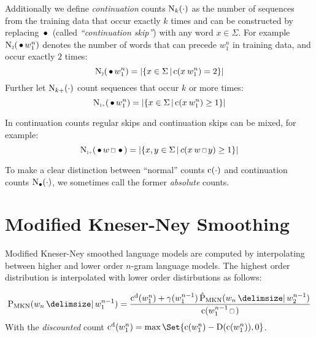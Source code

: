 
Additionally we define \emph{continuation} counts $\operatorname{N}_k(\cdot)$ as
the number of sequences from the training data that occur exactly $k$ times and
can be constructed by replacing $\,\bullet\,$ (called \emph{``continuation skip''})
with any word $x \in \Sigma$.
For example $\ContCountII(\WSkp w_1^n)$ denotes the number of words that can
precede $w_1^n$ in training data, and occur exactly $2$ times:
\begin{equation}
  \ContCountII(\WSkp w_1^n) =
    \Cardinality{\left\{ x \in \Sigma \,\middle|\, \Count(x \: w_1^n) = 2 \right\}}
\end{equation}
Further let $\operatorname{N}_{k+}(\cdot)$ count sequences that occur $k$ or more
times:
\begin{equation}
  \ContCountIp(\WSkp w_1^n) =
    \Cardinality{\left\{ x \in \Sigma \,\middle|\, \Count(x \: w_1^n) \geq 1 \right\}}
\end{equation}

In continuation counts regular skips and continuation skips can be mixed, for
example:
\begin{equation}
  \ContCountIp(\WSkp w \Skp \WSkp) =
    \Cardinality{\left\{ x, y \in \Sigma \,\middle|\, c(x \: w \Skp y) \geq 1 \right\}}
\end{equation}

To make a clear distinction between ``normal'' counts $\operatorname{c}(\cdot)$ and
continuation counts $\operatorname{N}_{\bullet}(\cdot)$, we
sometimes call the former \emph{absolute} counts.


\section{Modified Kneser-Ney Smoothing}
\label{sec:review-lm-mkn}

\begin{draft}
Modified Kneser-Ney smoothed language models are computed by interpolating
between higher and lower order $n$-gram language models.
The highest order distribution is interpolated with lower order distirbutions
as follows:
\end{draft}
\begin{equation}
  \label{eq:mkn-high}
  \ProbMKN{w_n}{w_1^{n-1}} =
    \frac{\DiscountedCount(w_1^n) + \gamma(w_1^{n-1}) \ProbMKN*{w_n}{w_2^{n-1}}}
         {\Count(w_1^{n-1} \Skp)} \\
\end{equation}
With the \emph{discounted} count
${\DiscountedCount(w_1^n) = \max\Set{\Count(w_1^n) - \Discount(\Count(w_1^n)), 0}}$.

